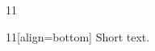 \documentclass[paper=A4]{ropas-poster}
\begin{document}
\begin{postergrid}{1}{1}
\begin{posterblock}{1}{1}[align=bottom]
Short text.
\end{posterblock}
\end{postergrid}
\end{document}
